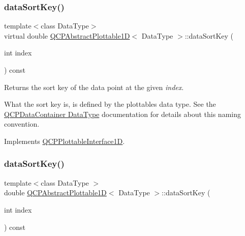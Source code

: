 \mbox{\label{class_q_c_p_abstract_plottable1_d_aa044a82f3400b52f49e247d30ffb162d}} 
\subsubsection{\texorpdfstring{data\+Sort\+Key()}{dataSortKey()}\hspace{0.1cm}{\footnotesize\ttfamily [1/2]}}
{\footnotesize\ttfamily template$<$class Data\+Type$>$ \\
virtual double \hyperlink{class_q_c_p_abstract_plottable1_d}{Q\+C\+P\+Abstract\+Plottable1D}$<$ Data\+Type $>$\+::data\+Sort\+Key (\begin{DoxyParamCaption}\item[{int}]{index }\end{DoxyParamCaption}) const\hspace{0.3cm}{\ttfamily [virtual]}}

Returns the sort key of the data point at the given {\itshape index}.

What the sort key is, is defined by the plottable\textquotesingle{}s data type. See the \hyperlink{class_q_c_p_data_container_qcpdatacontainer-datatype}{Q\+C\+P\+Data\+Container Data\+Type} documentation for details about this naming convention. 

Implements \hyperlink{class_q_c_p_plottable_interface1_d_afdc92f9f01e7e35f2e96b2ea9dc14ae7}{Q\+C\+P\+Plottable\+Interface1D}.

\mbox{\label{class_q_c_p_abstract_plottable1_d_a6fce4e684f33a31c45928899b5d9ab4b}} 
\subsubsection{\texorpdfstring{data\+Sort\+Key()}{dataSortKey()}\hspace{0.1cm}{\footnotesize\ttfamily [2/2]}}
{\footnotesize\ttfamily template$<$class Data\+Type $>$ \\
double \hyperlink{class_q_c_p_abstract_plottable1_d}{Q\+C\+P\+Abstract\+Plottable1D}$<$ Data\+Type $>$\+::data\+Sort\+Key (\begin{DoxyParamCaption}\item[{int}]{index }\end{DoxyParamCaption}) const\hspace{0.3cm}{\ttfamily [virtual]}}





